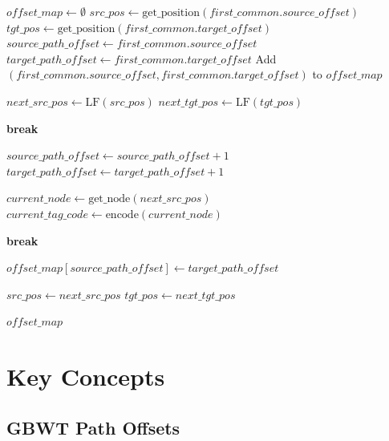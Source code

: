 \documentclass[11pt]{article}
\begin{document}
\begin{algorithmic}[1]
    \State $offset\_map \gets \emptyset$
    \State $src\_pos \gets \text{get\_position}(first\_common.source\_offset)$
    \State $tgt\_pos \gets \text{get\_position}(first\_common.target\_offset)$
    \State $source\_path\_offset \gets first\_common.source\_offset$
    \State $target\_path\_offset \gets first\_common.target\_offset$
    \State Add $(first\_common.source\_offset, first\_common.target\_offset)$ to $offset\_map$
    
        \State $next\_src\_pos \gets \text{LF}(src\_pos)$ 
        \State $next\_tgt\_pos \gets \text{LF}(tgt\_pos)$
        
            \State \textbf{break} 
        \EndIf
        
        \State $source\_path\_offset \gets source\_path\_offset + 1$
        \State $target\_path\_offset \gets target\_path\_offset + 1$
        
        \State $current\_node \gets \text{get\_node}(next\_src\_pos)$
        \State $current\_tag\_code \gets \text{encode}(current\_node)$
        
            \State \textbf{break} 
        \EndIf
        
            \State $offset\_map[source\_path\_offset] \gets target\_path\_offset$
        \EndIf
        
        \State $src\_pos \gets next\_src\_pos$
        \State $tgt\_pos \gets next\_tgt\_pos$
    \EndWhile
    
    \State \Return $offset\_map$
\end{algorithmic}

\section{Key Concepts}

\subsection{GBWT Path Offsets}
\end{document}
